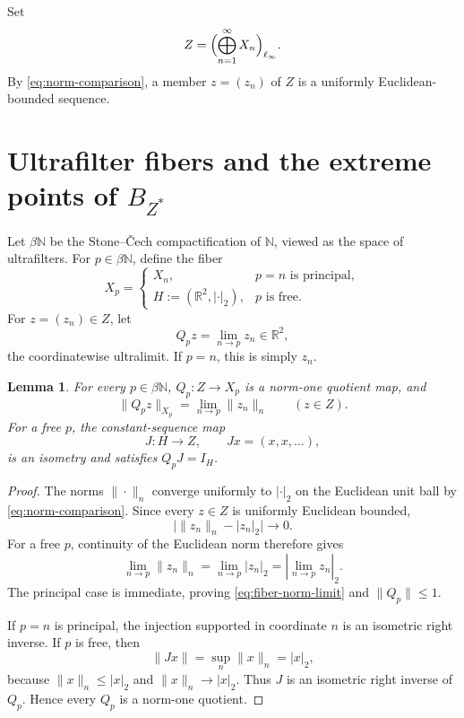 \documentclass[11pt]{article}
\newtheorem{lemma}[theorem]{Lemma}
\theoremstyle{definition}
\newcommand{\R}{\mathbb R}
\newcommand{\N}{\mathbb N}
\begin{document}
Set
\begin{equation}\label{eq:Z}
   Z=\Bigl(\bigoplus_{n=1}^\infty X_n\Bigr)_{\ell_\infty}.
\end{equation}
By \eqref{eq:norm-comparison}, a member $z=(z_n)$ of $Z$ is a uniformly
Euclidean-bounded sequence.

\section{Ultrafilter fibers and the extreme points of $B_{Z^*}$}

Let $\beta\N$ be the Stone--\v{C}ech compactification of $\N$, viewed as the
space of ultrafilters.  For $p\in\beta\N$, define the fiber
\[
 X_p=
 \begin{cases}
   X_n,&p=n\text{ is principal},\\
   H:=(\R^2,|\cdot|_2),&p\text{ is free}.
 \end{cases}
\]
For $z=(z_n)\in Z$, let
\[
  Q_pz=\lim_{n\to p}z_n\in\R^2,
\]
the coordinatewise ultralimit.  If $p=n$, this is simply $z_n$.

\begin{lemma}\label{lem:fiber-quotient}
For every $p\in\beta\N$, $Q_p:Z\to X_p$ is a norm-one quotient map, and
\begin{equation}\label{eq:fiber-norm-limit}
  \|Q_pz\|_{X_p}=\lim_{n\to p}\|z_n\|_n\qquad(z\in Z).
\end{equation}
For a free $p$, the constant-sequence map
\[
  J:H\longrightarrow Z,\qquad Jx=(x,x,\ldots),
\]
is an isometry and satisfies $Q_pJ=I_H$.
\end{lemma}

\begin{proof}
The norms $\|\cdot\|_n$ converge uniformly to $|\cdot|_2$ on the Euclidean
unit ball by \eqref{eq:norm-comparison}.  Since every $z\in Z$ is uniformly
Euclidean bounded,
\[
   \bigl|\|z_n\|_n-|z_n|_2\bigr|\longrightarrow0.
\]
For a free $p$, continuity of the Euclidean norm therefore gives
\[
 \lim_{n\to p}\|z_n\|_n
 =\lim_{n\to p}|z_n|_2
 =\left|\lim_{n\to p}z_n\right|_2.
\]
The principal case is immediate, proving \eqref{eq:fiber-norm-limit} and
$\|Q_p\|\le1$.

If $p=n$ is principal, the injection supported in coordinate $n$ is an
isometric right inverse.  If $p$ is free, then
\[
  \|Jx\|=\sup_n\|x\|_n=|x|_2,
\]
because $\|x\|_n\le|x|_2$ and $\|x\|_n\to|x|_2$.  Thus $J$ is an
isometric right inverse of $Q_p$.  Hence every $Q_p$ is a norm-one quotient.
\end{proof}
\end{document}
